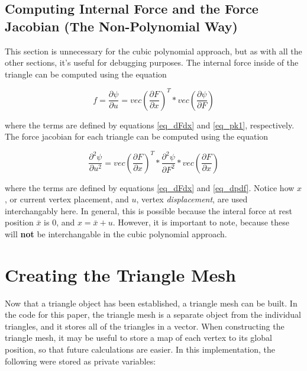 \documentclass[twocolumn,10pt]{asme2ej}
\begin{document}
\subsection{Computing Internal Force and the Force Jacobian (The Non-Polynomial Way)}

This section is unnecessary for the cubic polynomial approach, but as with all the other sections, it's useful for debugging purposes. The internal force inside of the triangle can be computed using the equation

\begin{equation}
f = \frac{\partial \psi}{\partial u} = vec(\frac{\partial F}{\partial x})^T*vec(\frac{\partial \psi}{\partial F})
\label{eq_triforce}
\end{equation}

where the terms are defined by equations \ref{eq_dFdx} and \ref{eq_pk1}, respectively. The force jacobian for each triangle can be computed using the equation

\begin{equation}
\frac{\partial^2 \psi}{\partial u^2} = vec(\frac{\partial F}{\partial x})^T*\frac{\partial^2 \psi}{\partial F^2}*vec(\frac{\partial F}{\partial x})
\label{eq_trijacob}
\end{equation}

where the terms are defined by equations \ref{eq_dFdx} and \ref{eq_dpdf}. Notice how $x$, or current vertex placement, and $u$, vertex \textit{displacement}, are used interchangably here. In general, this is possible because the interal force at rest position $\bar{x}$ is $0$, and $x = \bar{x} + u$. However, it is important to note, because these will \textbf{not} be interchangable in the cubic polynomial approach.


\section{Creating the Triangle Mesh}

Now that a triangle object has been established, a triangle mesh can be built. In the code for this paper, the triangle mesh is a separate object from the individual triangles, and it stores all of the triangles in a vector. When constructing the triangle mesh, it may be useful to store a map of each vertex to its global position, so that future calculations are easier. In this implementation, the following were stored as private variables:
\end{document}
